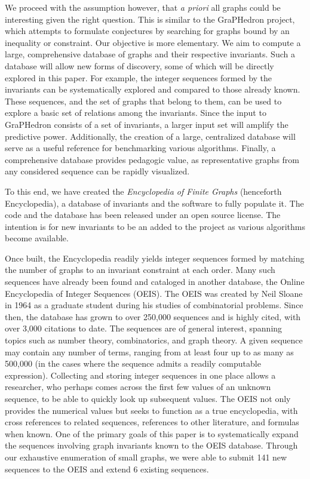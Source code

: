 \documentclass[12pt]{article}
\newcommand{\OEISeditsMain}{141\xspace}
\newcommand{\OEISeditsExtended}{6\xspace}
\begin{document}
We proceed with the assumption however, that \textit{a priori} all graphs could be interesting given the right question.
This is similar to the GraPHedron project\cite{melot2008facet}, which attempts to formulate conjectures by searching for graphs bound by an inequality or constraint.
Our objective is more elementary. We aim to compute a large, comprehensive database of graphs and their respective invariants. 
Such a database will allow new forms of discovery, some of which will be directly explored in this paper.
For example, the integer sequences formed by the invariants can be systematically explored and compared to those already known.
These sequences, and the set of graphs that belong to them, can be used to explore a basic set of relations among the invariants. 
Since the input to GraPHedron consists of a set of invariants, a larger input set will amplify the predictive power.
Additionally, the creation of a large, centralized database will serve as a useful reference for benchmarking various algorithms.
Finally, a comprehensive database provides pedagogic value, as representative graphs from any considered sequence can be rapidly visualized.

To this end, we have created the \textit{Encyclopedia of Finite Graphs} (henceforth Encyclopedia), a database of invariants\cite{Travis2014SimpleConnectedGraphs} and the software to fully populate it\cite{Travis2014Encyclopdia}. 
The code and the database has been released under an open source license.
The intention is for new invariants to be an added to the project as various algorithms become available.

Once built, the Encyclopedia readily yields integer sequences formed by matching the number of graphs to an invariant constraint at each order.
Many such sequences have already been found and cataloged in another database, the Online Encyclopedia of Integer Sequences (OEIS)\cite{sloane2003line}.
The OEIS was created by Neil Sloane in 1964 as a graduate student during his studies of combinatorial problems.
Since then, the database has grown to over 250,000 sequences and is highly cited, with over 3,000 citations to date.
The sequences are of general interest, spanning topics such as number theory, combinatorics, and graph theory.
A given sequence may contain any number of terms, ranging from at least four up to as many as 500,000 (in the cases where the sequence admits a readily computable expression).
Collecting and storing integer sequences in one place allows a researcher, who perhaps comes across the first few values of an unknown sequence, to be able to quickly look up subsequent values. 
The OEIS not only provides the numerical values but seeks to function as a true encyclopedia, with cross references to related sequences, references to other literature, and formulas when known.
One of the primary goals of this paper is to systematically expand the sequences involving graph invariants known to the OEIS database.
Through our exhaustive enumeration of small graphs, we were able to submit \OEISeditsMain new sequences to the OEIS and extend \OEISeditsExtended existing sequences.
\end{document}
